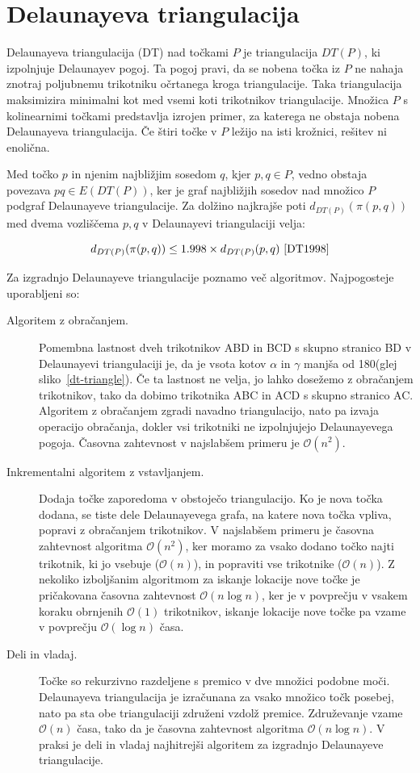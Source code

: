 \documentclass[a4paper, 12pt]{book}
\newcommand{\OO}{\ensuremath{\mathcal{O}}} %
\begin{document}
\section{Delaunayeva triangulacija}
Delaunayeva triangulacija (DT) nad točkami $P$ je triangulacija $DT(P)$, ki izpolnjuje Delaunayev pogoj. Ta pogoj pravi, da se nobena točka iz $P$ ne nahaja znotraj poljubnemu trikotniku očrtanega kroga triangulacije. Taka triangulacija
maksimizira minimalni kot med vsemi koti trikotnikov triangulacije. Množica $P$ s kolinearnimi točkami predstavlja izrojen primer, za katerega ne obstaja nobena Delaunayeva triangulacija. Če štiri točke v $P$ ležijo na isti krožnici, rešitev ni enolična.

Med točko $p$ in njenim najbližjim sosedom $q$, kjer $p,q\in P$, vedno obstaja povezava $pq\in E(DT(P))$, ker je graf najbližjih sosedov nad množico $P$ podgraf Delaunayeve triangulacije. Za dolžino najkrajše poti $d_{DT(P)}(\pi (p,q))$ med dvema 
vozliščema $p,q$ v Delaunayevi triangulaciji velja:

\begin{equation*}
d_{DT(P)}(\pi (p,q)) \le 1.998\times d_{DT(P)}(p,q)~\cite{DT1998}
\end{equation*}

Za izgradnjo Delaunayeve triangulacije poznamo več algoritmov. Najpogosteje uporabljeni so: 

\begin{description}
\item[Algoritem z obračanjem.] Pomembna lastnost dveh trikotnikov ABD in BCD s skupno stranico BD v Delaunayevi triangulaciji je, da je vsota kotov $\alpha$ in $\gamma$ manjša od 180\textdegree (glej sliko~\ref{dt-triangle}). Če ta lastnost ne velja, jo lahko dosežemo z obračanjem trikotnikov, tako da dobimo trikotnika ABC in ACD s skupno stranico AC. Algoritem z obračanjem zgradi navadno triangulacijo, nato pa izvaja operacijo obračanja, dokler vsi trikotniki ne izpolnjujejo Delaunayevega pogoja. Časovna zahtevnost v najslabšem primeru je $\OO(n^2)$.
\item[Inkrementalni algoritem z vstavljanjem.] Dodaja točke zaporedoma v obstoječo triangulacijo. Ko je nova točka dodana, se tiste dele Delaunayevega grafa, na katere nova točka vpliva, popravi z obračanjem trikotnikov. V najslabšem primeru je časovna zahtevnost algoritma $\OO(n^2)$, ker moramo za vsako dodano točko najti trikotnik, ki jo vsebuje ($\OO(n)$), in popraviti vse trikotnike ($\OO(n)$). Z nekoliko izboljšanim algoritmom za iskanje lokacije nove točke je pričakovana časovna zahtevnost $\OO(n\log n)$, ker je v povprečju v vsakem koraku obrnjenih $\OO(1)$ trikotnikov, iskanje lokacije nove točke pa vzame v povprečju $\OO(\log n)$ časa.
\item[Deli in vladaj.] Točke so rekurzivno razdeljene s premico v dve množici podobne moči. Delaunayeva triangulacija je izračunana za vsako množico točk posebej, nato pa sta obe triangulaciji združeni vzdolž premice. Združevanje vzame $\OO(n)$ časa, tako da je časovna zahtevnost algoritma $\OO(n\log n)$. V praksi je deli in vladaj najhitrejši algoritem za izgradnjo Delaunayeve triangulacije.
\end{description}
\end{document}
